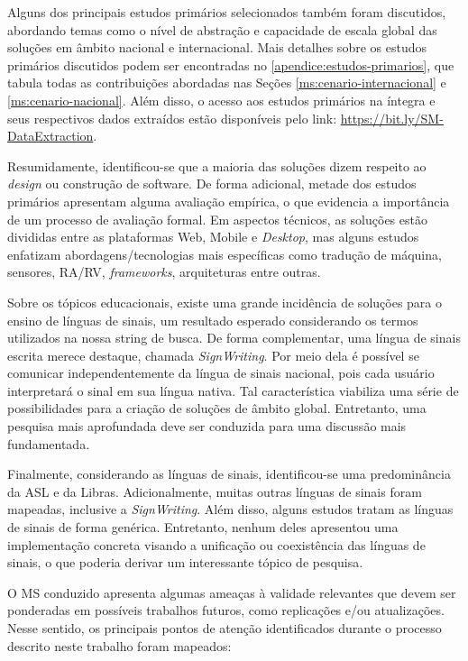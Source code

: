Alguns dos principais estudos primários selecionados também foram discutidos, abordando temas como o nível de abstração e capacidade de escala global das soluções em âmbito nacional e internacional. Mais detalhes sobre os estudos primários discutidos podem ser encontradas no \autoref{apendice:estudos-primarios}, que tabula todas as contribuições abordadas nas Seções \ref{ms:cenario-internacional} e \ref{ms:cenario-nacional}. Além disso, o acesso aos estudos primários na íntegra e seus respectivos dados extraídos estão disponíveis pelo link: \url{https://bit.ly/SM-DataExtraction}.

Resumidamente, identificou-se que a maioria das soluções dizem respeito ao \textit{design} ou construção de software. De forma adicional, metade dos estudos primários apresentam alguma avaliação empírica, o que evidencia a importância de um processo de avaliação formal. Em aspectos técnicos, as soluções estão divididas entre as plataformas Web, Mobile e \textit{Desktop}, mas alguns estudos enfatizam abordagens/tecnologias mais específicas como tradução de máquina, sensores, RA/RV, \textit{frameworks}, arquiteturas entre outras.

Sobre os tópicos educacionais, existe uma grande incidência de soluções para o ensino de línguas de sinais, um resultado esperado considerando os termos utilizados na nossa string de busca. De forma complementar, uma língua de sinais escrita merece destaque, chamada \textit{SignWriting}. Por meio dela é possível se comunicar  independentemente da língua de sinais nacional, pois cada usuário interpretará o sinal em sua língua nativa. Tal característica viabiliza uma série de possibilidades para a criação de soluções de âmbito global. Entretanto, uma pesquisa mais aprofundada deve ser conduzida para uma discussão mais fundamentada.

Finalmente, considerando as línguas de sinais, identificou-se uma predominância da ASL e da Libras. Adicionalmente, muitas outras línguas de sinais foram mapeadas, inclusive a \textit{SignWriting}. Além disso, alguns estudos tratam as línguas de sinais de forma genérica. Entretanto, nenhum deles apresentou uma implementação concreta visando a unificação ou coexistência das línguas de sinais, o que poderia derivar um interessante tópico de pesquisa.

O MS conduzido apresenta algumas ameaças à validade relevantes que devem ser ponderadas em possíveis trabalhos futuros, como replicações e/ou atualizações. Nesse sentido, os principais pontos de atenção identificados durante o processo descrito neste trabalho foram mapeados:

